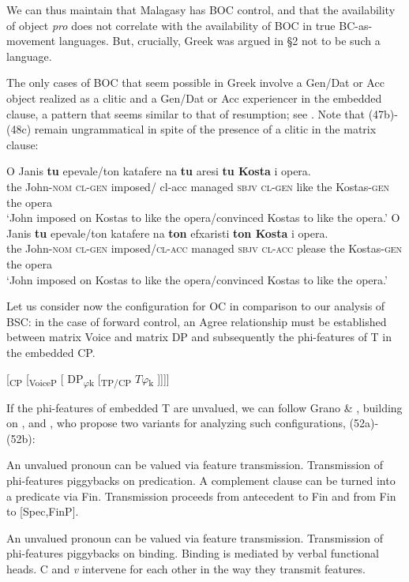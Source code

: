 \documentclass[output=paper]{langsci/langscibook}
\begin{document}
We can thus maintain that Malagasy has BOC control, and that the availability of object \textit{pro} does not correlate with the availability of BOC in true BC-as-movement languages. But, crucially, Greek was argued in §2 not to be such a language.

The only cases of BOC that seem possible in Greek involve a Gen/Dat or Acc object realized as a clitic and a Gen/Dat or Acc experiencer in the embedded clause, a pattern that seems similar to that of resumption; see . Note that (47b)-(48c) remain ungrammatical in spite of the presence of a clitic in the matrix clause:

\ea%
    \label{ex:alexiadou:50}
    \ea
    \gll O    Janis    \textbf{tu}  epevale/ton katafere   na   \textbf{tu} aresi  \textbf{tu  Kosta}          i opera.\\
                   the John-\textsc{nom}   \textsc{cl-gen}  imposed/ cl-acc managed  \textsc{sbjv} \textsc{cl-gen}  like   the Kostas-\textsc{gen} the opera\\
    \glt           ‘John imposed on Kostas to like the opera/convinced Kostas to like the opera.’
    \ex
    \gll O    Janis    \textbf{tu}  epevale/ton katafere   na   \textbf{ton} efxaristi  \textbf{ton  Kosta}         i opera.\\
           the John-\textsc{nom} \textsc{cl-gen}  imposed/\textsc{cl-acc} managed  \textsc{sbjv} \textsc{cl-acc}  please the Kostas-\textsc{gen} the opera\\
    \glt   ‘John imposed on Kostas to like the opera/convinced Kostas to like the opera.’
    \z
\z

Let us consider now the configuration for OC in comparison to our analysis of BSC: in the case of forward control, an Agree relationship must be established between matrix Voice and matrix DP and subsequently the phi-features of T in the embedded CP.    

\ea%
    \label{ex:alexiadou:51}
    [\textsubscript{CP} [\textsubscript{VoiceP} [ DP\textsubscript{$\varphi $}\textsubscript{k} [\textsubscript{TP/CP}    $T\varphi $\textsubscript{k}    ]]]]
    \z

If the phi-features of embedded T are unvalued, we can follow Grano \& \citet{Lasnik2016}, building on \citet{Kratzer2009}, and \citet{Landau2015}, who propose two variants for analyzing such configurations, (52a)-(52b):


\ea%
    \label{ex:alexiadou:52}
    \ea
    \begin{xlisti}
    \ex An unvalued pronoun can be valued via feature transmission.
    \ex Transmission of phi-features piggybacks on predication.
    \ex A complement clause can be turned into a predicate via Fin.
    \ex Transmission proceeds from antecedent to Fin and from Fin to [Spec,FinP].
    \end{xlisti}
    \ex
    \begin{xlisti}
    \ex An unvalued pronoun can be valued via feature transmission.
    \ex Transmission of phi-features piggybacks on binding.
    \ex Binding is mediated by verbal functional heads.
    \ex C and \textit{v} intervene for each other in the way they transmit features.
    \end{xlisti}
    \z
\z
\end{document}
